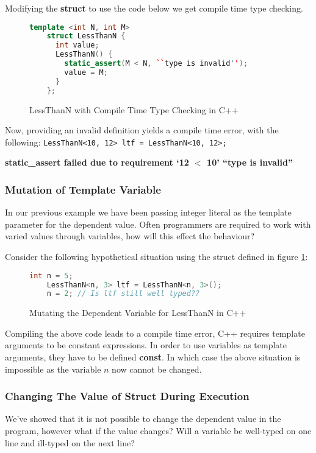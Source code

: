 \documentclass[a4paper,12pt]{report}
\begin{document}
\par
Modifying the \textbf{struct} to use the code below we get compile time type 
checking. 

\begin{figure}[H]
  \begin{lstlisting}[language=c++]     
    template <int N, int M>
    struct LessThanN {
      int value;
      LessThanN() {
        static_assert(M < N, ``type is invalid'');
        value = M;
      }
    };
  \end{lstlisting}
  \caption{LessThanN with Compile Time Type Checking in C++}
  \label{code:compileLTN}
\end{figure}

\par
Now, providing an invalid definition yields a compile time error, with the 
following: 
\verb+LessThanN<10, 12> ltf = LessThanN<10, 12>;+ 

\textbf{static\_assert failed due to requirement `12 $<$ 10' ``type is invalid''}

\subsubsection{Mutation of Template Variable}
In our previous example we have been passing integer literal as the template 
parameter for the dependent value. Often programmers are required to 
work with varied values through variables, how will this effect the behaviour? 

\par
Consider the following hypothetical situation using the struct defined in 
figure \ref{code:compileLTN}: 

\begin{figure}[H]
  \begin{lstlisting}[language=c++]     
    int n = 5;
    LessThanN<n, 3> ltf = LessThanN<n, 3>();
    n = 2; // Is ltf still well typed??
  \end{lstlisting}
  \caption{Mutating the Dependent Variable for LessThanN in C++}
\end{figure}

\par
Compiling the above code leads to a compile time error, C++ requires template 
arguments to be constant expressions. In order to use variables as template 
arguments, they have to be defined \textbf{const}. In which case the above 
situation is impossible as the variable $n$ now cannot be changed. 

\subsubsection{Changing The Value of Struct During Execution}
We've showed that it is not possible to change the dependent value in 
the program, however what if the value changes? Will a 
variable be well-typed on one line and ill-typed on the next line? 
\end{document}

